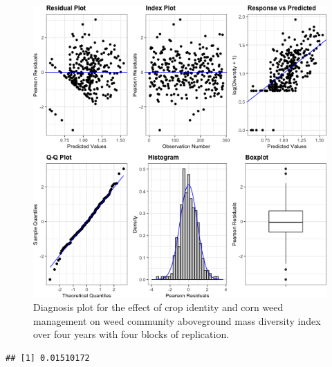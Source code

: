 \documentclass[
]{article}
\newenvironment{Shaded}{\begin{snugshade}}{\end{snugshade}}
\newcommand{\DecValTok}[1]{\textcolor[rgb]{0.00,0.00,0.81}{#1}}
\newcommand{\DocumentationTok}[1]{\textcolor[rgb]{0.56,0.35,0.01}{\textbf{\textit{#1}}}}
\newcommand{\FunctionTok}[1]{\textcolor[rgb]{0.00,0.00,0.00}{#1}}
\newcommand{\NormalTok}[1]{#1}
\newcommand{\SpecialCharTok}[1]{\textcolor[rgb]{0.00,0.00,0.00}{#1}}
\begin{document}
\begin{figure}
\centering
\includegraphics{AppendixA-model-diagnosis_files/figure-latex/biom-div-mod-1.png}
\caption{\label{fig:biom-div-mod}Diagnosis plot for the effect of crop identity and corn weed management on weed community aboveground mass diversity index over four years with four blocks of replication.}
\end{figure}

\begin{Shaded}
\end{Shaded}

\begin{verbatim}
## [1] 0.01510172
\end{verbatim}
\end{document}
